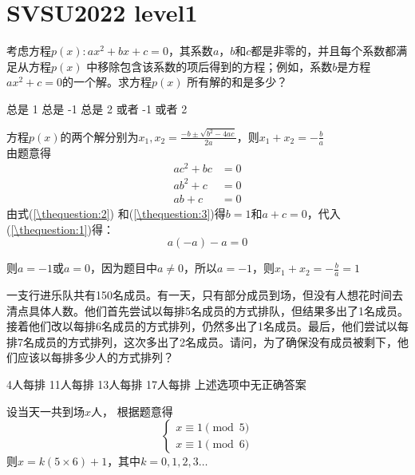 \section{SVSU2022 level1}
\begin{questions}
	\question 考虑方程$p(x): ax^2 + bx + c=0$，其系数$a$，$b$和$c$都是非零的，并且每个系数都满足从方程$p(x)$
	中移除包含该系数的项后得到的方程；例如，系数$b$是方程 $ax^2+c=0$的一个解。求方程$p(x)$
	所有解的和是多少？

	\begin{oneparchoices}
		\CorrectChoice 总是 1 \choice 总是 -1 \choice 总是 2  或者 -1  或者 2
	\end{oneparchoices}
	\begin{solution}
		方程$p(x)$的两个解分别为$\displaystyle x_1, x_2 = \frac{-b \pm \sqrt{b^2 - 4ac}}{2a}$，则$\displaystyle x_1 +
			x_2 = -\frac{b}{a}$\\
		由题意得
		\begin{align}
			ac^2  + bc & = 0 \label{\thequestion:1} \\
			ab^2  + c  & = 0 \label{\thequestion:2} \\
			ab    + c  & = 0 \label{\thequestion:3}
		\end{align}
		由式(\ref{\thequestion:2}) 和(\ref{\thequestion:3})得$b=1$和$a+c=0$，代入(\ref{\thequestion:1})得：
		\begin{equation}
			a(-a) -a  = 0
		\end{equation}

		则$a=-1$或$a=0$，因为题目中$a \ne 0$，所以$a=-1$，则$\displaystyle x_1 + x_2 = -\frac{b}{a}=1$
	\end{solution}
	\question 一支行进乐队共有150名成员。有一天，只有部分成员到场，但没有人想花时间去清点具体人数。他们首先尝试以每排5名成员的方式排队，但结果多出了1名成员。接着他们改以每排6名成员的方式排列，仍然多出了1名成员。最后，他们尝试以每排7名成员的方式排列，这次多出了2名成员。请问，为了确保没有成员被剩下，他们应该以每排多少人的方式排列？

	\begin{oneparchoices}
		\choice 4人每排
		\CorrectChoice 11人每排
		\choice 13人每排
		\choice 17人每排
		\choice 上述选项中无正确答案
	\end{oneparchoices}
	\begin{solution}
		设当天一共到场$x$人， 根据题意得
		\begin{equation}
			\begin{cases}
				x \equiv 1 \pmod 5 \\
				x \equiv 1 \pmod 6
			\end{cases}
		\end{equation}
		则$x=k(5 \times 6) + 1$，其中$k=0,1,2,3 \ldots$


\end{solution}
\end{questions}
